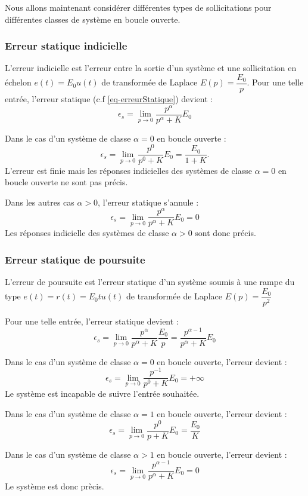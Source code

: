 Nous allons maintenant considérer différentes types de sollicitations pour 
différentes classes de système en boucle ouverte.
\subsubsection{Erreur statique indicielle}
L'erreur indicielle est l'erreur entre la sortie d'un système et une 
sollicitation en échelon $e(t)=E_0u(t)$ de transformée de Laplace 
$E(p)=\dfrac{E_0}{p}$. 
Pour une telle entrée, l'erreur statique (c.f \cref{eq-erreurStatique}) 
devient :
$$
\epsilon_s=\lim\limits_{p\to 0} \dfrac{p^\alpha}{p^\alpha+K}E_0
$$

Dans le cas d'un système de classe $\alpha=0$ en boucle ouverte :
$$
\epsilon_s=\lim\limits_{p\to 0} \dfrac{p^0}{p^0+K}E_0=\dfrac{E_0}{1+K}.
$$
L'erreur est finie mais les réponses indicielles des systèmes de classe 
$\alpha=0$ en boucle ouverte ne sont pas précis.

Dans les autres cas $\alpha>0$, l'erreur statique s'annule :
$$
\epsilon_s=\lim\limits_{p\to 0} \dfrac{p^\alpha}{p^\alpha+K}E_0=0
$$
Les réponses indicielle des systèmes de classe $\alpha>0$ sont donc précis.
\subsubsection{Erreur statique de poursuite}
L'erreur de poursuite est l'erreur statique d'un système soumis à une rampe 
du type $e(t)=r(t)=E_0t u(t)$
de transformée de Laplace $E(p)=\dfrac{E_0}{p^2}$

Pour une telle entrée, l'erreur statique devient :
$$
\epsilon_s=\lim\limits_{p\to 0} \dfrac{p^\alpha}{p^\alpha+K}\dfrac{E_0}{p}
          =\dfrac{p^{\alpha-1}}{p^\alpha+K}E_0 
$$

Dans le cas d'un système de classe $\alpha=0$ en boucle ouverte, 
l'erreur devient :
$$
\epsilon_s=\lim\limits_{p\to 0}\dfrac{p^{-1}}{p^0+K}E_0=+\infty
$$
Le système est incapable de suivre l'entrée souhaitée.

Dans le cas d'un système de classe $\alpha=1$ en boucle ouverte, 
l'erreur devient :
$$
\epsilon_s=\lim\limits_{p\to 0}\dfrac{p^0}{p+K}E_0=\dfrac{E_0}{K}
$$

Dans le cas d'un système de classe $\alpha>1$ en boucle ouverte, 
l'erreur devient :
$$
\epsilon_s=\lim\limits_{p\to 0}\dfrac{p^{\alpha-1}}{p^\alpha+K}E_0=0
$$
Le système est donc prècis.
